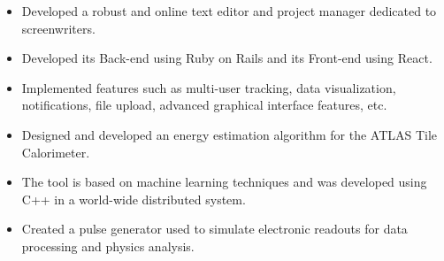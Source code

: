\documentclass[10pt,a4paper,ragged2e]{altacv}
\begin{document}

\begin{fullwidth}
\makecvheader
\end{fullwidth}



\begin{itemize}
\item Developed a robust and online text editor and project manager dedicated to screenwriters.
\item Developed its Back-end using Ruby on Rails and its Front-end using React.
\item Implemented features such as multi-user tracking, data visualization, notifications, file upload, advanced graphical interface features, etc.
\end{itemize}

\divider

\begin{itemize}
	\item Designed and developed an energy estimation algorithm for the ATLAS Tile Calorimeter.
	\item The tool is based on machine learning techniques and was developed using C++ in a world-wide distributed system.
	\item Created a pulse generator used to simulate electronic readouts for data processing and physics analysis.
\end{itemize}
\end{document}
